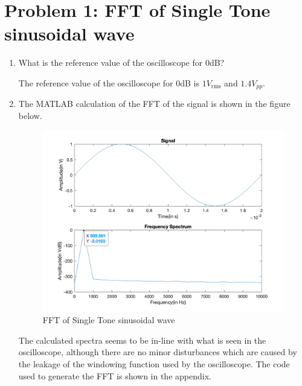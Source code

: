 \section{Problem 1: FFT of Single Tone sinusoidal wave}

\begin{enumerate}
    \item What is the reference value of the oscilloscope for 0dB?

          The reference value of the oscilloscope for 0dB is $1V_{\text{rms}}$ and $1.4V_{pp}$.
    \item The MATLAB calculation of the FFT of the signal is shown in the figure below.
          \begin{figure}[H]
              \centering
              \includegraphics[width=0.75\linewidth]{images/evaluation_problem2.png}
              \caption{FFT of Single Tone sinusoidal wave}
              \label{fig:fft_single_tone}
          \end{figure}
          The calculated spectra seems to be in-line with what is seen in the oscilloscope, although there are no minor disturbances which are caused by the leakage of the windowing function used by the oscilloscope.
          The code used to generate the FFT is shown in the appendix.


\end{enumerate}
